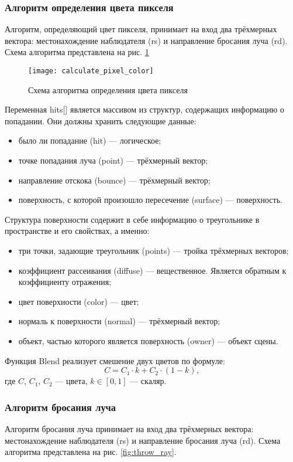\subsubsection{Алгоритм определения цвета пикселя}
Алгоритм, определяющий цвет пикселя, принимает на вход два трёхмерных вектора: местонахождение наблюдателя (rs) и направление бросания луча (rd). Схема алгоритма представлена на рис. \ref{fig:calculate_pixel_color}

\begin{figure}[!ht]
	\centering
	\texttt{[image: calculate\_pixel\_color]}
	\caption{Схема алгоритма определения цвета пикселя}
	\label{fig:calculate_pixel_color}
\end{figure}

Переменная hits[] является массивом из структур, содержащих информацию о попадании. Они должны хранить следующие данные:
\begin{itemize}
	\item было ли попадание (hit) --- логическое;
	\item точке попадания луча (point) --- трёхмерный вектор;
	\item направление отскока (bounce) --- трёхмерный вектор;
	\item поверхность, с которой произошло пересечение (surface) --- поверхность.
\end{itemize}

Структура поверхности содержит в себе информацию о треугольнике в пространстве и его свойствах, а именно:
\begin{itemize}
	\item три точки, задающие треугольник (points) --- тройка трёхмерных векторов;
	\item коэффициент рассеивания (diffuse) --- вещественное. Является обратным к коэффициенту отражения;
	\item цвет поверхности (color) --- цвет;
	\item нормаль к поверхности (normal) --- трёхмерный вектор;
	\item объект, частью которого является поверхность (owner) --- объект сцены.
\end{itemize}

Функция Blend реализует смешение двух цветов по формуле:
\begin{equation}
	C = C_1\cdot k+C_2\cdot(1-k),
\end{equation}
где $C$, $C_1$, $C_2$ --- цвета, $k\in[0, 1]$ --- скаляр.

\subsubsection{Алгоритм бросания луча}
Алгоритм бросания луча принимает на вход два трёхмерных вектора: местонахождение наблюдателя (rs) и направление бросания луча (rd). Схема алгоритма представлена на рис. \ref{fig:throw_ray}.

